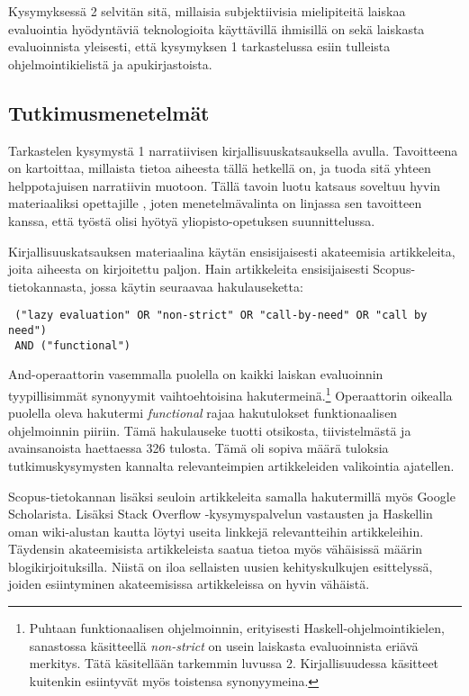 Kysymyksessä 2 selvitän sitä, millaisia subjektiivisia mielipiteitä laiskaa evaluointia hyödyntäviä teknologioita käyttävillä ihmisillä on sekä laiskasta evaluoinnista yleisesti, että kysymyksen 1 tarkastelussa esiin tulleista ohjelmointikielistä ja apukirjastoista.

\subsection{Tutkimusmenetelmät}

Tarkastelen kysymystä 1 narratiivisen kirjallisuuskatsauksella avulla. Tavoitteena on kartoittaa, millaista tietoa aiheesta tällä hetkellä on, ja tuoda sitä yhteen helppotajuisen narratiivin muotoon. Tällä tavoin luotu katsaus soveltuu hyvin materiaaliksi opettajille \citep[s. 312]{baumeister1997writing}, joten menetelmävalinta on linjassa sen tavoitteen kanssa, että työstä olisi hyötyä yliopisto-opetuksen suunnittelussa.

Kirjallisuuskatsauksen materiaalina käytän ensisijaisesti akateemisia artikkeleita, joita aiheesta on kirjoitettu paljon. Hain artikkeleita ensisijaisesti Scopus-tietokannasta, jossa käytin seuraavaa hakulauseketta:

\begin{verbatim}
 ("lazy evaluation" OR "non-strict" OR "call-by-need" OR "call by need")
 AND ("functional")
\end{verbatim}

And-operaattorin vasemmalla puolella on kaikki laiskan evaluoinnin tyypillisimmät synonyymit vaihtoehtoisina hakutermeinä.\footnote{Puhtaan funktionaalisen ohjelmoinnin, erityisesti Haskell-ohjelmointikielen, sanastossa käsitteellä \textit{non-strict} on usein laiskasta evaluoinnista eriävä merkitys. Tätä käsitellään tarkemmin luvussa 2. Kirjallisuudessa käsitteet kuitenkin esiintyvät myös toistensa synonyymeina.} Operaattorin oikealla puolella oleva hakutermi \textit{functional} rajaa hakutulokset funktionaalisen ohjelmoinnin piiriin. Tämä hakulauseke tuotti otsikosta, tiivistelmästä ja avainsanoista haettaessa 326 tulosta. Tämä oli sopiva määrä tuloksia tutkimuskysymysten kannalta relevanteimpien artikkeleiden valikointia ajatellen.

Scopus-tietokannan lisäksi seuloin artikkeleita samalla hakutermillä myös Google Scholarista. Lisäksi Stack Overflow -kysymyspalvelun vastausten ja Haskellin oman wiki-alustan kautta löytyi useita linkkejä relevantteihin artikkeleihin. Täydensin akateemisista artikkeleista saatua tietoa myös vähäisissä määrin blogikirjoituksilla. Niistä on iloa sellaisten uusien kehityskulkujen esittelyssä, joiden esiintyminen akateemisissa artikkeleissa on hyvin vähäistä.

